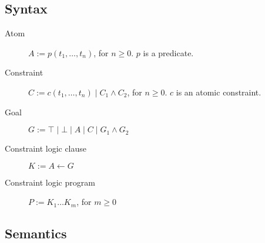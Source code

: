 \subsection{Syntax}

\begin{description}
    \item[Atom] 
        $A := p(t_1, \dots, t_n)$, for $n \geq 0$. $p$ is a predicate.
    \item[Constraint] 
        $C := c(t_1, \dots, t_n) \mid C_1 \land C_2$, for $n \geq 0$. $c$ is an atomic constraint.
    \item[Goal] 
        $G := \top \mid \bot \mid A \mid C \mid G_1 \land G_2$ 
    \item[Constraint logic clause] 
        $K := A \leftarrow G$ 
    \item[Constraint logic program] 
        $P := K_1 \dots K_m$, for $m \geq 0$ 
\end{description}


\subsection{Semantics}

